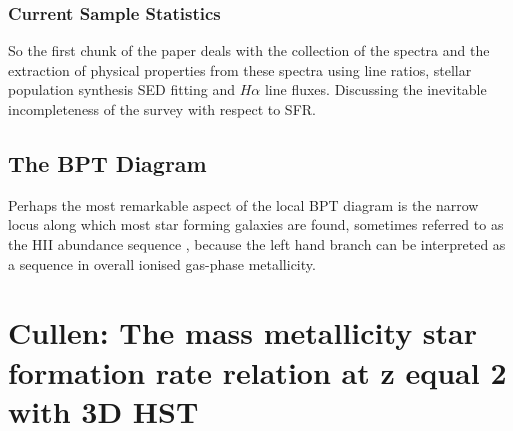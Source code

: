 \documentclass{literature}
\begin{document}
\subsubsection{Current Sample Statistics}
So the first chunk of the paper deals with the collection of the spectra and the extraction of physical properties from these spectra using line ratios, stellar population synthesis SED fitting and $H\alpha$ line fluxes. Discussing the inevitable incompleteness of the survey with respect to SFR.  

\subsection{The BPT Diagram}
Perhaps the most remarkable aspect of the local BPT diagram is the narrow locus along which most star forming galaxies are found, sometimes referred to as the HII abundance sequence \citep{Dopita2000}, because the left hand branch can be interpreted as a sequence in overall ionised gas-phase metallicity. 



\section{Cullen: The mass metallicity star formation rate relation at z equal 2 with 3D HST}
\end{document}
